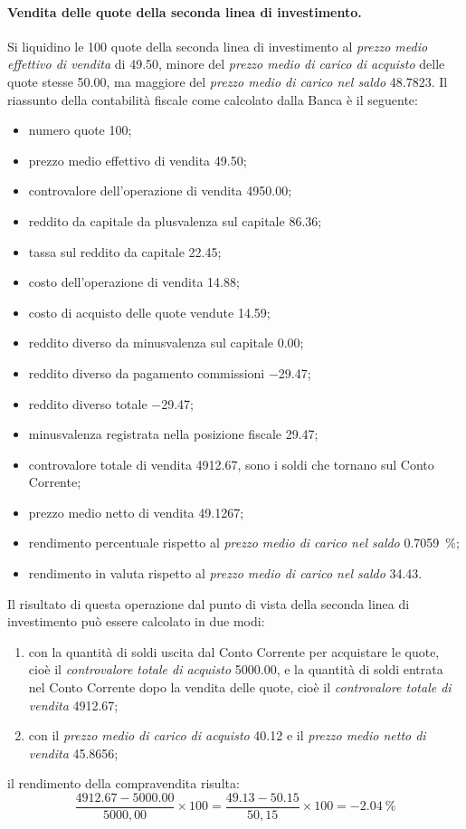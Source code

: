 \documentclass[12pt,a4paper]{article}
\newcommand{\Eur}[1]{\SI{#1}{\text{\euro{}}}}
\newcommand{\CalcoloRendimentoPercentuale}[2]{\frac{\num{#1} - \num{#2}}{#2} \times{} \num{100}}
\newcommand{\PrezzoMedioEffettivoVendita}{\emph{prezzo medio effettivo di vendita}}
\newcommand{\PrezzoMedioCaricoAcquisto}{\emph{prezzo medio di carico di acquisto}}
\newcommand{\PrezzoMedioCaricoSaldo}{\emph{prezzo medio di carico nel saldo}}
\begin{document}
\paragraph{Vendita delle quote della seconda linea di investimento.}
Si    liquidino    le    \num{100}    quote    della    seconda    linea    di    investimento    al
\PrezzoMedioEffettivoVendita{} di  \Eur{49,50}, minore del \PrezzoMedioCaricoAcquisto{}  delle quote
stesse \Eur{50,00},  ma maggiore  del \PrezzoMedioCaricoSaldo{}  \Eur{48,7823}.  Il  riassunto della
contabilità fiscale come calcolato dalla Banca è il seguente:
\begin{itemize}
\item numero quote \num{100};
\item prezzo medio effettivo di vendita \Eur{49,50};
\item controvalore dell'operazione di vendita \Eur{4950,00};
\item reddito da capitale da plusvalenza sul capitale \Eur{86,36};
\item tassa sul reddito da capitale \Eur{22,45};
\item costo dell'operazione di vendita \Eur{14,88};
\item costo di acquisto delle quote vendute \Eur{14,59};
\item reddito diverso da minusvalenza sul capitale \Eur{0,00};
\item reddito diverso da pagamento commissioni \Eur{-29,47};
\item reddito diverso totale \Eur{-29,47};
\item minusvalenza registrata nella posizione fiscale \Eur{29,47};
\item controvalore totale di vendita \Eur{4912,67}, sono i soldi che tornano sul Conto Corrente;
\item prezzo medio netto di vendita \Eur{49,1267};
\item rendimento percentuale rispetto al \PrezzoMedioCaricoSaldo{} \SI{0,7059}{\percent};
\item rendimento in valuta rispetto al \PrezzoMedioCaricoSaldo{} \Eur{34,43}.
\end{itemize}
Il risultato di questa operazione dal punto di  vista della seconda linea di investimento può essere
calcolato in due modi:
\begin{enumerate}
\item  con la  quantità  di  soldi uscita  dal  Conto  Corrente per  acquistare  le  quote, cioè  il
  \emph{controvalore totale  di acquisto} \Eur{5000,00},  e la quantità  di soldi entrata  nel Conto
  Corrente dopo la vendita delle quote, cioè il \emph{controvalore totale di vendita} \Eur{4912,67};
\item con il \emph{prezzo medio di carico di  acquisto} \Eur{40,12} e il \emph{prezzo medio netto di
     vendita} \Eur{45,8656};
\end{enumerate}
il rendimento della compravendita risulta:
\begin{equation*}
  \CalcoloRendimentoPercentuale{4912,67}{5000,00} =
  \CalcoloRendimentoPercentuale{49,13}{50,15} = \SI{-2,04}{\percent}
\end{equation*}
\end{document}
